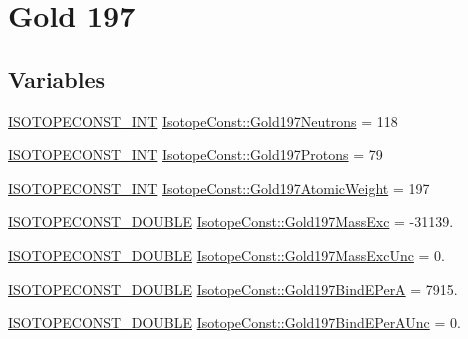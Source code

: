 \hypertarget{group___isotope_const-_gold-_au197}{}\section{Gold 197}
\label{group___isotope_const-_gold-_au197}
\subsection*{Variables}
\begin{DoxyCompactItemize}
\item 
\mbox{\hyperlink{group___isotope_const-_macros_ga5f18360b3e99483a35c32d789e62621c}{I\+S\+O\+T\+O\+P\+E\+C\+O\+N\+S\+T\+\_\+\+I\+NT}} \mbox{\hyperlink{group___isotope_const-_gold-_au197_ga21672fbbe726ec6f11d22a5efcf3e4a9}{Isotope\+Const\+::\+Gold197\+Neutrons}} = 118
\item 
\mbox{\hyperlink{group___isotope_const-_macros_ga5f18360b3e99483a35c32d789e62621c}{I\+S\+O\+T\+O\+P\+E\+C\+O\+N\+S\+T\+\_\+\+I\+NT}} \mbox{\hyperlink{group___isotope_const-_gold-_au197_ga234c313fb0f9e58211c146f256f882d2}{Isotope\+Const\+::\+Gold197\+Protons}} = 79
\item 
\mbox{\hyperlink{group___isotope_const-_macros_ga5f18360b3e99483a35c32d789e62621c}{I\+S\+O\+T\+O\+P\+E\+C\+O\+N\+S\+T\+\_\+\+I\+NT}} \mbox{\hyperlink{group___isotope_const-_gold-_au197_gad5a8898e7bb7d4cd224bde8a453be610}{Isotope\+Const\+::\+Gold197\+Atomic\+Weight}} = 197
\item 
\mbox{\hyperlink{group___isotope_const-_macros_ga8f45a7272ce02c0b4c65c44636ed719a}{I\+S\+O\+T\+O\+P\+E\+C\+O\+N\+S\+T\+\_\+\+D\+O\+U\+B\+LE}} \mbox{\hyperlink{group___isotope_const-_gold-_au197_ga36a1898dbc493eb53e4b981f0ba3bd48}{Isotope\+Const\+::\+Gold197\+Mass\+Exc}} = -\/31139.
\item 
\mbox{\hyperlink{group___isotope_const-_macros_ga8f45a7272ce02c0b4c65c44636ed719a}{I\+S\+O\+T\+O\+P\+E\+C\+O\+N\+S\+T\+\_\+\+D\+O\+U\+B\+LE}} \mbox{\hyperlink{group___isotope_const-_gold-_au197_ga3b95b274edfe54910a708dfb8eecd5f8}{Isotope\+Const\+::\+Gold197\+Mass\+Exc\+Unc}} = 0.
\item 
\mbox{\hyperlink{group___isotope_const-_macros_ga8f45a7272ce02c0b4c65c44636ed719a}{I\+S\+O\+T\+O\+P\+E\+C\+O\+N\+S\+T\+\_\+\+D\+O\+U\+B\+LE}} \mbox{\hyperlink{group___isotope_const-_gold-_au197_ga88d86371a400ebcee68e4640bfe9cdb9}{Isotope\+Const\+::\+Gold197\+Bind\+E\+PerA}} = 7915.
\item 
\mbox{\hyperlink{group___isotope_const-_macros_ga8f45a7272ce02c0b4c65c44636ed719a}{I\+S\+O\+T\+O\+P\+E\+C\+O\+N\+S\+T\+\_\+\+D\+O\+U\+B\+LE}} \mbox{\hyperlink{group___isotope_const-_gold-_au197_ga564bc07c8f13de191f16fac0323c77a2}{Isotope\+Const\+::\+Gold197\+Bind\+E\+Per\+A\+Unc}} = 0.

\end{DoxyCompactItemize}
